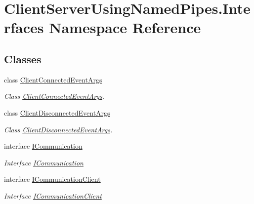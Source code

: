 \hypertarget{namespace_client_server_using_named_pipes_1_1_interfaces}{}\section{Client\+Server\+Using\+Named\+Pipes.\+Interfaces Namespace Reference}
\label{namespace_client_server_using_named_pipes_1_1_interfaces}
\subsection*{Classes}
\begin{DoxyCompactItemize}
\item 
class \hyperlink{class_client_server_using_named_pipes_1_1_interfaces_1_1_client_connected_event_args}{Client\+Connected\+Event\+Args}
\begin{DoxyCompactList}\small\item\em Class \hyperlink{class_client_server_using_named_pipes_1_1_interfaces_1_1_client_connected_event_args}{Client\+Connected\+Event\+Args}. \end{DoxyCompactList}\item 
class \hyperlink{class_client_server_using_named_pipes_1_1_interfaces_1_1_client_disconnected_event_args}{Client\+Disconnected\+Event\+Args}
\begin{DoxyCompactList}\small\item\em Class \hyperlink{class_client_server_using_named_pipes_1_1_interfaces_1_1_client_disconnected_event_args}{Client\+Disconnected\+Event\+Args}. \end{DoxyCompactList}\item 
interface \hyperlink{interface_client_server_using_named_pipes_1_1_interfaces_1_1_i_communication}{I\+Communication}
\begin{DoxyCompactList}\small\item\em Interface \hyperlink{interface_client_server_using_named_pipes_1_1_interfaces_1_1_i_communication}{I\+Communication} \end{DoxyCompactList}\item 
interface \hyperlink{interface_client_server_using_named_pipes_1_1_interfaces_1_1_i_communication_client}{I\+Communication\+Client}
\begin{DoxyCompactList}\small\item\em Interface \hyperlink{interface_client_server_using_named_pipes_1_1_interfaces_1_1_i_communication_client}{I\+Communication\+Client} \end{DoxyCompactList}\item 

\end{DoxyCompactItemize}
